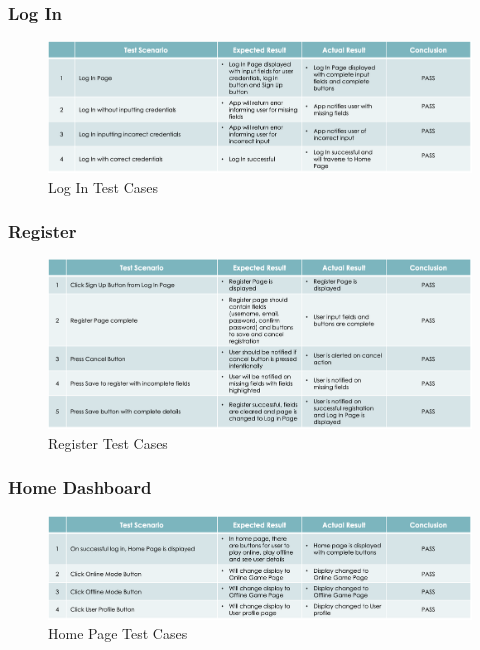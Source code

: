 \documentclass{article}
\begin{document}
    \subsubsection{Log In}
        \begin{figure}[h]
            \centering
            \includegraphics[width=5.5in]{images/test_2_log.png}
        \caption{Log In Test Cases}
        \end{figure}
        \newpage
    \subsubsection{Register}
        \begin{figure}[h]
            \centering
            \includegraphics[width=5.5in]{images/test_3_register.png}
        \caption{Register Test Cases}
        \end{figure}
    \subsubsection{Home Dashboard}
        \begin{figure}[h]
            \centering
            \includegraphics[width=5.5in]{images/test_4_home.png}
        \caption{Home Page Test Cases}
        \end{figure}
        \newpage
\end{document}
